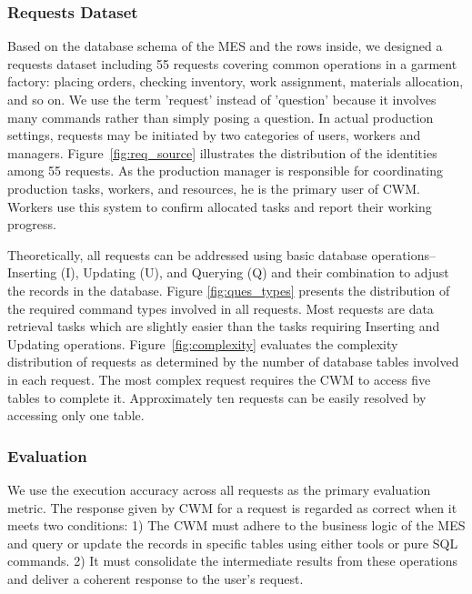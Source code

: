 \documentclass[preprint,12pt]{elsarticle}
\begin{document}
\subsubsection{Requests Dataset}
Based on the database schema of the MES and the rows inside, we designed a requests dataset including 55 requests covering common operations in a garment factory: placing orders, checking inventory, work assignment, materials allocation, and so on.
We use the term 'request' instead of 'question' because it involves many commands rather than simply posing a question.
In actual production settings, requests may be initiated by two categories of users, workers and managers. Figure~\ref{fig:req_source} illustrates the distribution of the identities among 55 requests.
As the production manager is responsible for coordinating production tasks, workers, and resources, he is the primary user of CWM.
Workers use this system to confirm allocated tasks and report their working progress.

Theoretically, all requests can be addressed using basic database operations--Inserting (I), Updating (U), and Querying (Q) and their combination to adjust the records in the database.
Figure \ref{fig:ques_types} presents the distribution of the required command types involved in all requests.
Most requests are data retrieval tasks which are slightly easier than the tasks requiring Inserting and Updating operations.
Figure~\ref{fig:complexity} evaluates the complexity distribution of requests as determined by the number of database tables involved in each request.
The most complex request requires the CWM to access five tables to complete it.
Approximately ten requests can be easily resolved by accessing only one table.

\subsubsection{Evaluation}

We use the execution accuracy across all requests as the primary evaluation metric.
The response given by CWM for a request is regarded as correct when it meets two conditions: 
1) The CWM must adhere to the business logic of the MES and query or update the records in specific tables using either tools or pure SQL commands. 
2) It must consolidate the intermediate results from these operations and deliver a coherent response to the user's request.
\end{document}
